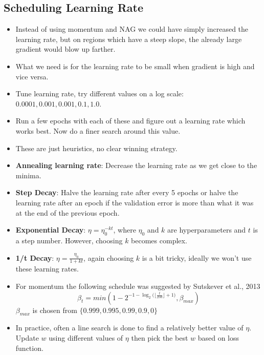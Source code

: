\documentclass[a4paper]{article}
\begin{document}
\subsection{Scheduling Learning Rate}
\begin{itemize}
    \item Instead of using momentum and NAG we could have simply increased the learning rate, but on regions which have a steep slope, the already large gradient would blow up farther.
    \item What we need is for the learning rate to be small when gradient is high and vice versa.
    \item Tune learning rate, try different values on a log scale: $0.0001, 0.001, 0.001, 0.1, 1.0$.
    \item Run a few epochs with each of these and figure out a learning rate which works best. Now do a finer search around this value.
    \item These are just heuristics, no clear winning strategy.
    \item \textbf{Annealing learning rate}: Decrease the learning rate as we get close to the minima.
    \item \textbf{Step Decay}: Halve the learning rate after every 5 epochs or halve the learning rate after an epoch if the validation error is more than what it was at the end of the previous epoch.
    \item \textbf{Exponential Decay}: $\eta = \eta_0^{-kt}$, where $\eta_0$ and $k$ are hyperparameters and $t$ is a step number. However, choosing $k$ becomes complex.
    \item \textbf{1/t Decay}: $\eta = \frac{\eta_0}{1+kt}$, again choosing $k$ is a bit tricky, ideally we won't use these learning rates.
    \item For momentum the following schedule was suggested by Sutskever et al., 2013
    \begin{equation*}
        \beta_t = min(1-2^{-1-\log_2{(\lfloor \frac{t}{250}\rfloor+1})},\beta_{max})
    \end{equation*}
    $\beta_{max}$ is chosen from $\{0.999,0.995,0.99,0.9,0\}$
    \item In practice, often a line search is done to find a relatively better value of $\eta$. Update $w$ using different values of $\eta$ then pick the best $w$ based on loss function.
\end{itemize}

\end{document}
